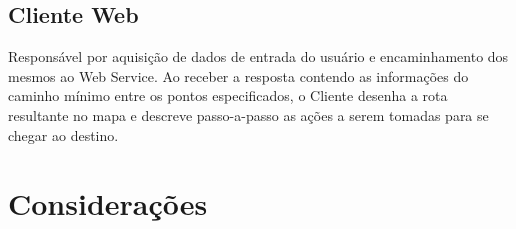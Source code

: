 \subsection{Cliente Web}
Responsável por aquisição de dados de entrada do usuário e encaminhamento dos mesmos ao Web Service. 
Ao receber a resposta contendo as informações do caminho mínimo entre os pontos especificados, o Cliente desenha a rota resultante no mapa e descreve passo-a-passo as ações a serem tomadas para se chegar ao destino.

\section{Considerações}

